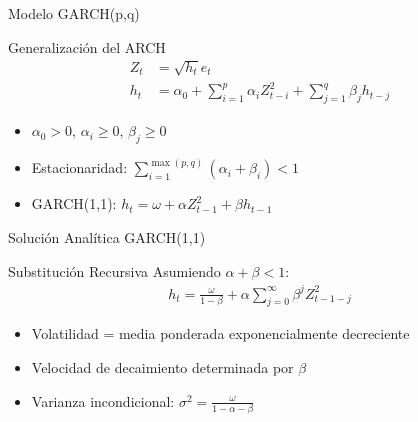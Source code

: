 \begin{frame}{Modelo GARCH(p,q)}
    \begin{block}{Generalización del ARCH}
        \begin{align}
            Z_t &= \sqrt{h_t} e_{t} \\
            h_t &= \alpha_0 + \sum_{i=1}^{p} \alpha_i Z_{t-i}^2 + \sum_{j=1}^{q} \beta_j h_{t-j}
        \end{align}
    \end{block}
    
    \vspace{0.5em}
    
    \begin{itemize}
        \item<2-> $\alpha_0 > 0$, $\alpha_i \geq 0$, $\beta_j \geq 0$
        \item<3-> Estacionaridad: $\sum_{i=1}^{\max(p,q)} (\alpha_i + \beta_i) < 1$
        \item<4-> GARCH(1,1): $h_t = \omega + \alpha Z_{t-1}^2 + \beta h_{t-1}$
    \end{itemize}
\end{frame}

\begin{frame}{Solución Analítica GARCH(1,1)}
    \begin{block}{Substitución Recursiva}
        Asumiendo $\alpha + \beta < 1$:
        \begin{align}
            h_t = \frac{\omega}{1-\beta} + \alpha \sum_{j=0}^{\infty} \beta^j Z_{t-1-j}^2
        \end{align}
    \end{block}
    
    \vspace{0.5em}
    
    \begin{itemize}
        \item<2-> Volatilidad = media ponderada exponencialmente decreciente
        \item<3-> Velocidad de decaimiento determinada por $\beta$
        \item<4-> Varianza incondicional: $\sigma^2 = \frac{\omega}{1 - \alpha - \beta}$
    \end{itemize}
    
    \vspace{0.5em}
    
\end{frame}

